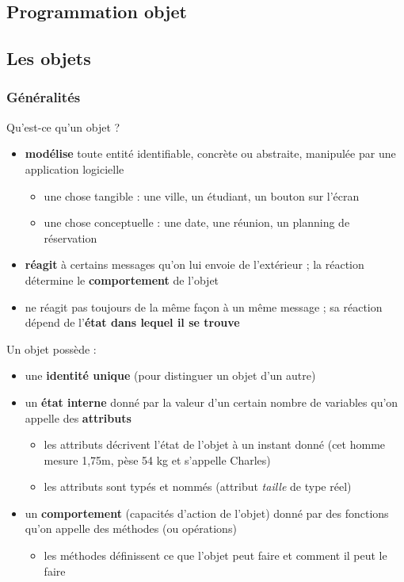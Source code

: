 
\subsection{Programmation objet}

\subsection{Les objets}
\subsubsection*{Généralités}

\begin{frame}{Qu'est-ce qu'un objet ?}
\begin{itemize}
	\item \textbf{modélise} toute entité identifiable, concrète ou abstraite, manipulée par une application logicielle
	\begin{itemize}
		\item une chose tangible : une ville, un étudiant, un bouton sur l'écran
		\item une chose conceptuelle : une date, une réunion, un planning de réservation
	\end{itemize}
	\item \textbf{réagit} à certains messages qu'on lui envoie de l'extérieur ; la réaction détermine le \textbf{comportement} de l'objet
	\item ne réagit pas toujours de la même façon à un même message ; sa réaction dépend de l'\textbf{état dans lequel il se trouve}
\end{itemize}
\end{frame}

\begin{frame}{Un objet possède : }
\begin{itemize}
	\item une \textbf{identité unique} (pour distinguer un objet d'un autre)
	\item un \textbf{état interne} donné par la valeur d'un certain nombre de variables
	qu'on appelle des \textbf{attributs}
	\begin{itemize}
		\item les attributs décrivent l'état de l'objet à un instant donné (cet homme mesure 1,75m, pèse 54 kg et s'appelle Charles)
		\item les attributs sont typés et nommés (attribut \textit{taille} de type réel)
	\end{itemize}
	\item un \textbf{comportement} (capacités d'action de l'objet) donné par des fonctions qu'on appelle des méthodes (ou opérations)
	\begin{itemize}
		\item les méthodes définissent ce que l'objet peut faire et comment il peut le faire
 	\end{itemize}
\end{itemize}
\end{frame}

